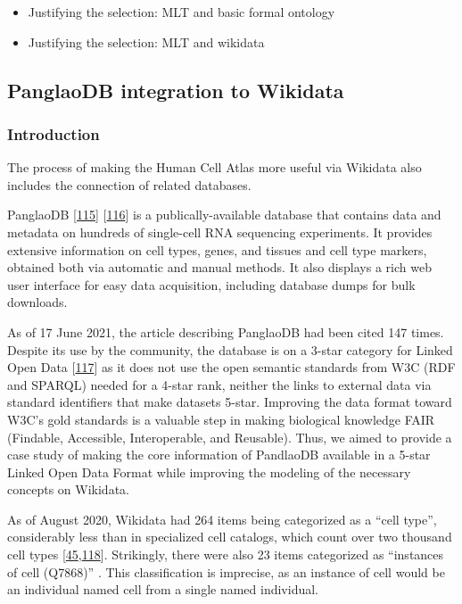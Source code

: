 \begin{itemize}
\item
  Justifying the selection: MLT and basic formal ontology
\item
  Justifying the selection: MLT and wikidata
\end{itemize}

\hypertarget{panglaodb-integration-to-wikidata}{%
\subsection{PanglaoDB integration to Wikidata}\label{panglaodb-integration-to-wikidata}}

\hypertarget{introduction}{%
\subsubsection{Introduction}\label{introduction}}

The process of making the Human Cell Atlas more useful via Wikidata also includes the connection of related databases.

PanglaoDB {[}\protect\hyperlink{ref-M0lqRYJb}{115}{]} {[}\protect\hyperlink{ref-T3PlZ3Vh}{116}{]} is a publically-available database that contains data and metadata on hundreds of single-cell RNA sequencing experiments.
It provides extensive information on cell types, genes, and tissues and cell type markers, obtained both via automatic and manual methods.
It also displays a rich web user interface for easy data acquisition, including database dumps for bulk downloads.

As of 17 June 2021, the article describing PanglaoDB had been cited 147 times.
Despite its use by the community, the database is on a 3-star category for Linked Open Data {[}\protect\hyperlink{ref-OGXYtGZ8}{117}{]} as it does not use the open semantic standards from W3C (RDF and SPARQL) needed for a 4-star rank, neither the links to external data via standard identifiers that make datasets 5-star.
Improving the data format toward W3C's gold standards is a valuable step in making biological knowledge FAIR (Findable, Accessible, Interoperable, and Reusable).
Thus, we aimed to provide a case study of making the core information of PandlaoDB available in a 5-star Linked Open Data Format while improving the modeling of the necessary concepts on Wikidata.

As of August 2020, Wikidata had 264 items being categorized as a ``cell type'', considerably less than in specialized cell catalogs, which count over two thousand cell types {[}\protect\hyperlink{ref-agnqfdk6}{45},\protect\hyperlink{ref-4AEy2xhQ}{118}{]}.
Strikingly, there were also 23 items categorized as ``instances of cell (Q7868)'' . This classification is imprecise, as an instance of cell would be an individual named cell from a single named individual.

